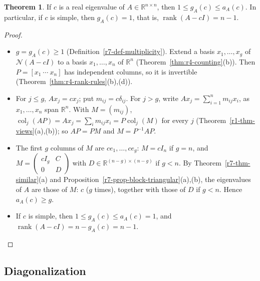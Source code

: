 \documentclass[12pt]{article}
\newcommand{\R}{\mathbb R}
\DeclareMathOperator{\col}{col}
\DeclareMathOperator{\rank}{rank}
\theoremstyle{definition}
\newtheorem{theorem}{Theorem}
\begin{document}
\begin{theorem}\label{r7-thm-geo-alg}
If \(c\) is a real eigenvalue of \(A\in\R^{n\times n}\), then \(1\leqslant g_A(c)\leqslant a_A(c)\). In particular, if
\(c\) is simple, then \(g_A(c)=1\), that is, \(\rank(A-cI)=n-1\).
\end{theorem}
\begin{proof}
\begin{itemize}
\item \(g=g_A(c)\geqslant1\) (Definition~\ref{r7-def-multiplicity}). Extend a basis \(x_1,\dots,x_g\) of \(\mathcal N(A-cI)\)
to a basis \(x_1,\dots,x_n\) of \(\R^n\) (Theorem~\ref{thm:r4-counting}(b)). Then \(P=[x_1\ \cdots\ x_n]\) has
independent columns, so it is invertible (Theorem~\ref{thm:r4-rank-rules}(b),(d)).
\item For \(j\leqslant g\), \(Ax_j=cx_j\); put \(m_{ij}=c\delta_{ij}\). For \(j>g\), write \(Ax_j=\sum_{i=1}^nm_{ij}x_i\), as
\(x_1,\dots,x_n\) span \(\R^n\). With \(M=(m_{ij})\), \(\col_j(AP)=Ax_j=\sum_im_{ij}x_i=P\col_j(M)\) for every \(j\)
(Theorem~\ref{r1-thm-views}(a),(b)); so \(AP=PM\) and \(M=P^{-1}AP\).
\item The first \(g\) columns of \(M\) are \(ce_1,\dots,ce_g\): \(M=cI_n\) if \(g=n\), and
\(M=\left(\begin{smallmatrix}cI_g&C\\0&D\end{smallmatrix}\right)\) with \(D\in\R^{(n-g)\times(n-g)}\) if \(g<n\). By
Theorem~\ref{r7-thm-similar}(a) and Proposition~\ref{r7-prop-block-triangular}(a),(b), the eigenvalues of \(A\) are those of
\(M\): \(c\) (\(g\) times), together with those of \(D\) if \(g<n\). Hence \(a_A(c)\geqslant g\).
\item If \(c\) is simple, then \(1\leqslant g_A(c)\leqslant a_A(c)=1\), and \(\rank(A-cI)=n-g_A(c)=n-1\).\qedhere
\end{itemize}
\end{proof}

\subsection*{Diagonalization}
\end{document}
